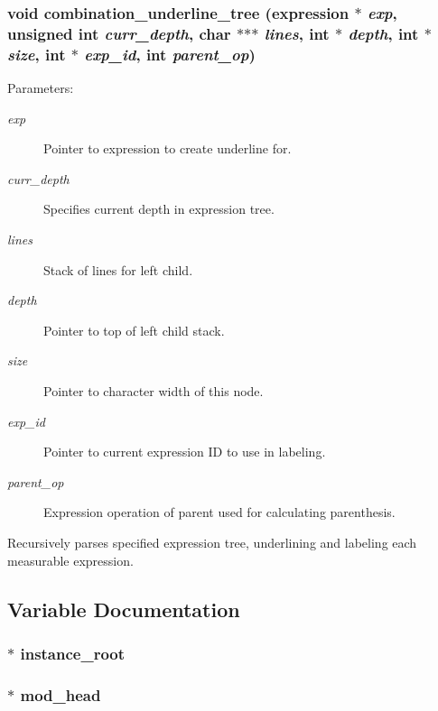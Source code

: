 \subsubsection{\setlength{\rightskip}{0pt plus 5cm}void combination\_\-underline\_\-tree ({\bf expression} $\ast$ {\em exp}, unsigned int {\em curr\_\-depth}, char $\ast$$\ast$$\ast$ {\em lines}, int $\ast$ {\em depth}, int $\ast$ {\em size}, int $\ast$ {\em exp\_\-id}, int {\em parent\_\-op})}\label{comb_8c_a11}


\begin{Desc}
\item[Parameters: ]\par
\begin{description}
\item[{\em 
exp}]Pointer to expression to create underline for. \item[{\em 
curr\_\-depth}]Specifies current depth in expression tree. \item[{\em 
lines}]Stack of lines for left child. \item[{\em 
depth}]Pointer to top of left child stack. \item[{\em 
size}]Pointer to character width of this node. \item[{\em 
exp\_\-id}]Pointer to current expression ID to use in labeling. \item[{\em 
parent\_\-op}]Expression operation of parent used for calculating parenthesis.\end{description}
\end{Desc}
Recursively parses specified expression tree, underlining and labeling each measurable expression. 

\subsection{Variable Documentation}
\subsubsection{$\ast$ instance\_\-root}\label{comb_8c_a0}


\subsubsection{$\ast$ mod\_\-head}\label{comb_8c_a1}


